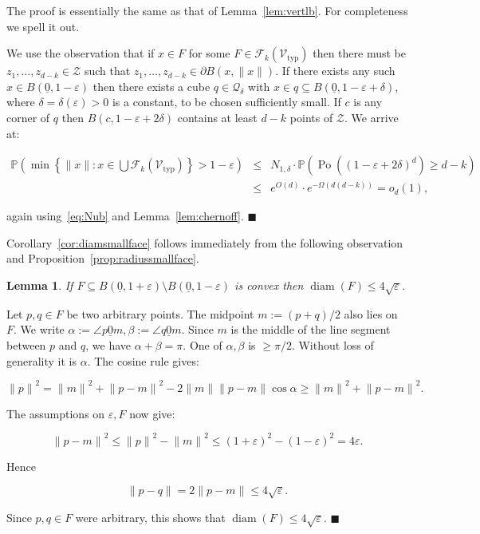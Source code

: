 \documentclass[11pt]{article}%
\newenvironment{proof}{\vspace{1ex}\noindent{\bf Proof.}}{\hspace*{\fill}$\blacksquare$\vspace{1ex}}
\newtheorem{lemma} [theorem] {Lemma}%
\newcommand{\Fcal}[0]{\ensuremath{{\mathcal F}}}
\newcommand{\Qcal}[0]{\ensuremath{{\mathcal Q}}}
\newcommand{\Vcal}[0]{\ensuremath{{\mathcal V}}}
\newcommand{\Zcal}[0]{\ensuremath{{\mathcal Z}}}
\newcommand{\norm}[1]{\ensuremath{\|#1\|}}
\newcommand{\Pee}[0]{\ensuremath{{\mathbb P}}}
\newcommand{\eps}{\varepsilon}
\newcommand{\orig}{\underline{0}}
\DeclareMathOperator{\diam}{diam}
\DeclareMathOperator{\Po}{Po}
\newcommand{\Vtyp}[0]{\Vcal_{\text{typ}}}
\begin{document}
The proof is essentially the same as that of Lemma~\ref{lem:vertlb}. For completeness we spell it out.

\begin{proof}
We use the observation that if $x \in F$ for some $F \in \Fcal_k(\Vtyp)$ then there must be 
$z_1,\dots,z_{d-k} \in \Zcal$ such that 
$z_1,\dots,z_{d-k} \in \partial B(x,\norm{x})$.
If there exists any such $x \in B(\orig,1-\eps)$ then there exists a cube $q \in \Qcal_\delta$ with 
$x \in q \subseteq B(\orig,1-\eps+\delta)$, where $\delta=\delta(\eps)>0$ is a constant, to be chosen sufficiently small.
If $c$ is any corner of $q$ then $B(c,1-\eps+2\delta)$ contains at least $d-k$ points of $\Zcal$.
We arrive at:

$$ \begin{array}{rcl} 
\Pee\left( \min\left\{ \norm{x} : x \in \bigcup \Fcal_k(\Vtyp)  \right\} > 1-\eps \right)
& \leq & 
N_{1,\delta} \cdot \Pee\left( \Po( (1-\eps+2\delta)^d ) \geq d-k \right) \\
& \leq & 
e^{O(d)} \cdot e^{-\Omega( d(d-k) )} = o_d(1), 
\end{array} $$

\noindent 
again using~\eqref{eq:Nub} and Lemma~\ref{lem:chernoff}.
\end{proof}

Corollary~\ref{cor:diamsmallface} follows immediately from the following observation and Proposition~\ref{prop:radiussmallface}.

\begin{lemma}\label{lem:diamconvinann}
If $F \subseteq B(\orig,1+\eps)\setminus B(\orig,1-\eps)$ is convex then $\diam(F) \leq 4\sqrt{\eps}$.
\end{lemma}

\begin{proof}
Let $p,q \in F$ be two arbitrary points. The midpoint $m := (p+q)/2$ also lies on $F$.
We write $\alpha := \angle p\orig m, \beta := \angle q\orig m$. Since $m$ is the middle of the 
line segment between $p$ and $q$, we have $\alpha+\beta=\pi$. One of $\alpha,\beta$ is $\geq \pi/2$.
Without loss of generality it is $\alpha$.
The cosine rule gives:

$$ \norm{p}^2 = \norm{m}^2 + \norm{p-m}^2 - 2 \norm{m}\norm{p-m}\cos\alpha
\geq \norm{m}^2 + \norm{p-m}^2. $$

\noindent
The assumptions on $\eps, F$ now give:

$$ \norm{p-m}^2 \leq \norm{p}^2 - \norm{m}^2 
\leq (1+\eps)^2 - (1-\eps)^2 = 4\eps. $$

Hence 

$$\norm{p-q} = 2\norm{p-m} \leq 4\sqrt{\eps}. $$

\noindent
Since $p,q \in F$ were arbitrary, this shows that $\diam(F) \leq 4\sqrt{\eps}$.
\end{proof}
\end{document}
